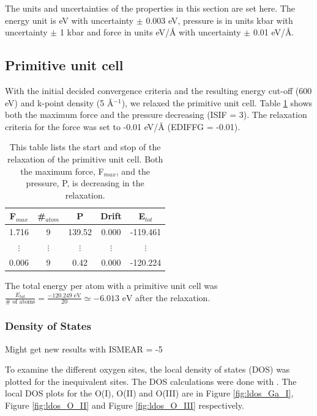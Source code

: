 The units and uncertainties of the properties in this section are set here. The energy unit is eV with uncertainty $\pm$ 0.003 eV, pressure is in units kbar with uncertainty $\pm$ 1 kbar and force in units eV/Å with uncertainty $\pm$ 0.01 eV/Å.


\subsection{Primitive unit cell}

With the initial decided convergence criteria and the resulting energy cut-off (600 eV) and k-point density (5 Å$^{-1}$), we relaxed the primitive unit cell. Table \ref{tab:ionstep_primitive} shows both the maximum force and the pressure decreasing (ISIF = 3). The relaxation criteria for the force was set to -0.01 eV/Å (EDIFFG = -0.01).

\begin{table}[H]\caption{This table lists the start and stop of the relaxation of the primitive unit cell. Both the maximum force, F$_{max}$, and the pressure, P, is decreasing in the relaxation.}\label{tab:ionstep_primitive}
\begin{tabular}{ccccc}
F$_{max}$ &\#$_{atom}$&	P&	Drift&	E$_{tot}$\\ \hline
1.716&	9&	139.52&	0.000&	-119.461\\
$\vdots$&$\vdots$&$\vdots$&$\vdots$&$\vdots$\\
0.006&	9&	0.42&	0.000&	-120.224\\
\end{tabular}
\end{table}

The total energy per atom with a primitive unit cell was $\frac{E_{tot}}{\# \text{ of atoms}} = \frac{-120.249 \text{ eV}}{20} \simeq -6.013 \text{ eV}$ after the relaxation.

\subsubsection{Density of States}

Might get new results with ISMEAR = -5

To examine the different oxygen sites, the local density of states (DOS) was plotted for the inequivalent sites. The DOS calculations were done with . The local DOS plots for the O(I), O(II) and O(III) are in Figure \ref{fig:ldos_Ga_I}, Figure \ref{fig:ldos_O_II} and Figure \ref{fig:ldos_O_III} respectively.


